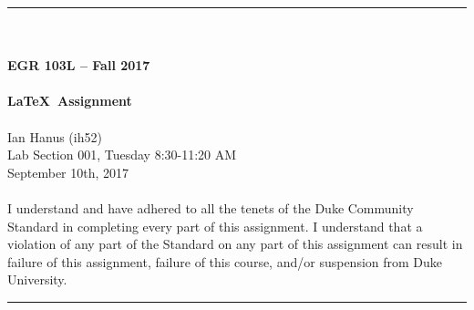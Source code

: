 \documentclass{article}
\begin{document}
\begin{center}
\rule{6.5in}{0.5mm}\\~\\
\textbf{\large EGR 103L -- Fall 2017}\\~\\
\textbf{\huge \LaTeX~Assignment}\\~\\
Ian Hanus (ih52)\\
Lab Section 001, Tuesday 8:30-11:20 AM\\
September 10th, 2017\\~\\
{\small I understand and have adhered to all the tenets of the Duke
  Community Standard in completing every part of this assignment.  I
  understand that a violation of any part of the Standard on any part
  of this assignment can result in failure of this assignment, failure
  of this course, and/or suspension from Duke University.} 
\rule{6.5in}{0.5mm}\\
\end{center}
\tableofcontents
\listoffigures
\pagebreak
\end{document}

